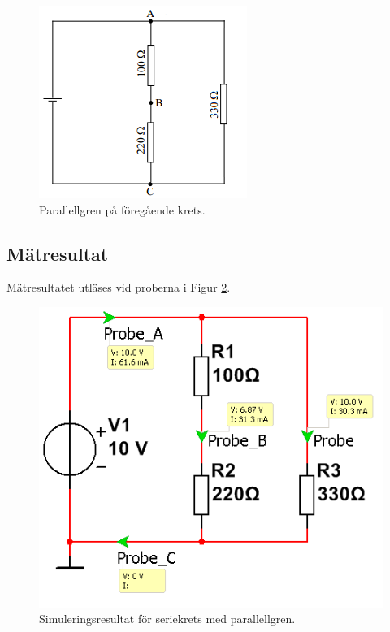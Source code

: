 \documentclass[11pt,a4paper]{article}
\begin{document}
\begin{figure}[htbp]
    \centering
        \includegraphics[scale=1.0]{misc/krets2.png}
    \caption{Parallellgren på föregående krets.}
    \label{fig:2-mm-schem}
\end{figure}

\subsection{Mätresultat}\label{}
Mätresultatet utläses vid proberna i Figur \ref{fig:sim-para}.


\begin{figure}[htbp]
    \centering
    \includegraphics[scale=0.5]{ee466multisim/2.png}
    \caption{Simuleringsresultat för seriekrets med parallellgren.}
    \label{fig:sim-para}
\end{figure}
\end{document}
